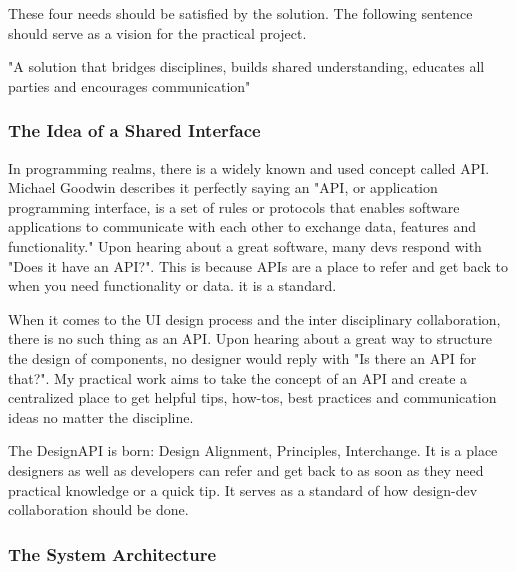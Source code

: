 These four needs should be satisfied by the solution. The following sentence should serve as a
vision for the practical project.

"A solution that bridges disciplines, builds shared understanding, educates all parties and
encourages communication"

\subsubsection{The Idea of a Shared Interface}


In programming realms, there is a widely known and used concept called API. Michael Goodwin
describes it perfectly saying an "API, or application programming interface, is a set of rules or
protocols that enables software applications to communicate with each other to exchange data,
features and functionality."  Upon hearing about a
great software, many devs respond with "Does it have an API?". This is because APIs are a place to
refer and get back to when you need functionality or data. it is a standard.

When it comes to the UI design process and the inter disciplinary collaboration, there is no such
thing as an API. Upon hearing about a great way to structure the design of components, no designer
would reply with "Is there an API for that?". My practical work aims to take the concept of an API
and create a centralized place to get helpful tips, how-tos, best practices and communication ideas
no matter the discipline. 

The DesignAPI is born: Design Alignment, Principles, Interchange. It is a place designers as well as
developers can refer and get back to as soon as they need practical knowledge or a quick tip. It
serves as a standard of how design-dev collaboration should be done.

\subsubsection{The System Architecture}
% 
        
